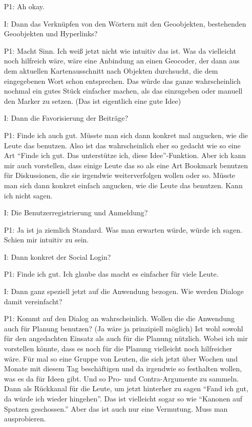 \begin{itemize}
    \item[P1:] Ah okay.
    \item[I:] Dann das Verkn{\"u}pfen von den W{\"o}rtern mit den Geoobjekten, bestehenden Geoobjekten und Hyperlinks?
    \item[P1:] Macht Sinn. Ich weiß jetzt nicht wie intuitiv das ist. Was da vielleicht noch hilfreich wäre, wäre eine Anbindung an einen Geocoder, der dann aus dem aktuellen Kartenausschnitt nach Objekten durchsucht, die dem eingegebenen Wort schon entsprechen. Das würde das ganze wahrscheinlich nochmal ein gutes Stück einfacher machen, als das einzugeben oder manuell den Marker zu setzen. (Das ist eigentlich eine gute Idee)
    \item[I:] Dann die Favorisierung der Beiträge?
    \item[P1:] Finde ich auch gut. Müsste man sich dann konkret mal angucken, wie die Leute das benutzen. Also ist das wahrscheinlich eher so gedacht wie so eine Art "`Finde ich gut. Das unterstütze ich, diese Idee"'-Funktion. Aber ich kann mir auch vorstellen, dass einige Leute das so als eine Art Bookmark benutzen für Diskussionen, die sie irgendwie weiterverfolgen wollen oder so. Müsste man sich dann konkret einfach angucken, wie die Leute das benutzen. Kann ich nicht sagen.
    \item[I:] Die Benutzerregistrierung und Anmeldung?
    \item[P1:] Ja ist ja ziemlich Standard. Was man erwarten würde, würde ich sagen. Schien mir intuitiv zu sein.
    \item[I:] Dann konkret der Social Login?
    \item[P1:] Finde ich gut. Ich glaube das macht es einfacher für viele Leute.
    \item[I:] Dann ganz speziell jetzt auf die Anwendung bezogen. Wie werden Dialoge damit vereinfacht?
    \item[P1:] Kommt auf den Dialog an wahrscheinlich. Wollen die die Anwendung auch für Planung benutzen? (Ja wäre ja prinzipiell möglich) Ist wohl sowohl für den angedachten Einsatz als auch für die Planung nützlich. Wobei ich mir vorstellen könnte, dass es noch für die Planung vielleicht noch hilfreicher wäre. Für mal so eine Gruppe von Leuten, die sich jetzt über Wochen und Monate mit diesem Tag beschäftigen und da irgendwie so festhalten wollen, was es da für Ideen gibt. Und so Pro- und Contra-Argumente zu sammeln. Dann als Rückkanal für die Leute, um jetzt hinterher zu sagen "`Fand ich gut, da würde ich wieder hingehen"'. Das ist vielleicht sogar so wie "`Kanonen auf Spatzen geschossen."' Aber das ist auch nur eine Vermutung. Muss man ausprobieren. 

\end{itemize}
